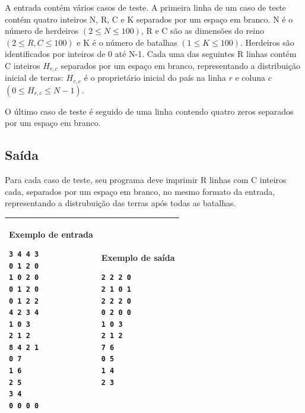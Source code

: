 A entrada contém vários casos de teste. A primeira linha de um caso de teste
contém quatro inteiros N, R, C e K separados por um espaço em branco. N é o
número de herdeiros $(2 \leq N \leq 100)$, R e C são as dimensões do reino $(2
\leq R,C \leq 100)$ e K é o número de batalhas $(1 \leq K \leq 100)$. Herdeiros são
identificados por inteiros de 0 até N-1. Cada uma das seguintes R linhas contém
C inteiros $H_{r,c}$ separados por um espaço em branco, representando a distribuição
inicial de terras: $H_{r,c}$ é o proprietário inicial do país na linha $r$ e
coluna $c$ $(0 \leq H_{r,c} \leq N-1)$.

O último caso de teste é seguido de uma linha contendo quatro zeros separados
por um espaço em branco.

\subsection*{Saída}

Para cada caso de teste, seu programa deve imprimir R linhas com C inteiros
cada, separados por um espaço em branco, no mesmo formato da entrada,
representando a distrubuição das terras após todas as batalhas.

\begin{table}[!h]
\centering
\begin{tabular}{|l|l|}
\hline
\begin{minipage}[t]{3in}
\textbf{Exemplo de entrada}
\begin{verbatim}
3 4 4 3
0 1 2 0
1 0 2 0
0 1 2 0
0 1 2 2
4 2 3 4
1 0 3
2 1 2
8 4 2 1
0 7
1 6
2 5
3 4
0 0 0 0
\end{verbatim}
\vspace{1mm}
\end{minipage}
&

\begin{minipage}[t]{3in}
\textbf{Exemplo de saída}
\begin{verbatim}
2 2 2 0
2 1 0 1
2 2 2 0
0 2 0 0
1 0 3
2 1 2
7 6
0 5
1 4
2 3
\end{verbatim}
\vspace{1mm}
\end{minipage} \\
\hline
\end{tabular}
\end{table}

\newpage
